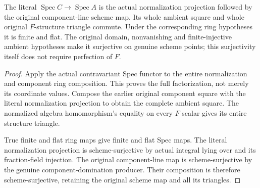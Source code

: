 \begin{theorem}
\label{scheme:normalized-line-component-map}
\leanok
{}
The literal $\operatorname{Spec}C\to\operatorname{Spec}A$ is the actual
normalization projection followed by the original component-line scheme
map. Its whole ambient square and whole original $F$-structure triangle
commute. Under the corresponding ring hypotheses it is finite and flat.
The original domain, nonvanishing and finite-injective ambient hypotheses
make it surjective on genuine scheme points; this surjectivity itself
does not require perfection of $F$.
\end{theorem}
\begin{proof}
Apply the actual contravariant Spec functor to the entire normalization
and component ring composition. This proves the full factorization, not
merely its coordinate values. Compose the earlier original component
square with the literal normalization projection to obtain the complete
ambient square. The normalized algebra homomorphism's equality on every
$F$ scalar gives its entire structure triangle.

True finite and flat ring maps give finite and flat Spec maps. The
literal normalization projection is scheme-surjective by actual integral
lying over and its fraction-field injection. The original component-line
map is scheme-surjective by the genuine component-domination producer.
Their composition is therefore scheme-surjective, retaining the original
scheme map and all its triangles.
\end{proof}

